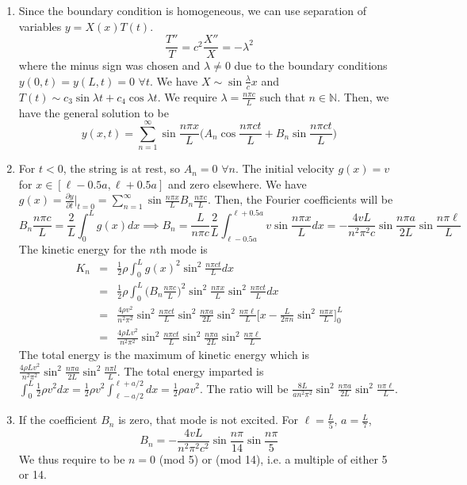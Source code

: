 \documentclass[a4paper]{article}
\begin{document}
\begin{ans}\leavevmode
\begin{enumerate}[label=(\alph*)]
\item Since the boundary condition is homogeneous, we can use separation of variables $y=X(x)T(t)$.
$$\frac{T''}{T}=c^2\frac{X''}{X}=-\lambda^2$$
where the minus sign was chosen and $\lambda\neq 0$ due to the boundary conditions $y(0,t)=y(L,t)=0$ $\forall t$. We have $X\sim\sin\frac{\lambda}{c}x$ and $T(t)\sim c_3\sin\lambda t+c_4\cos\lambda t$. We require $\lambda=\frac{n\pi c}{L}$ such that $n\in\mathbb{N}$. Then, we have the general solution to be
$$y(x,t)=\sum_{n=1}^\infty\sin\frac{n\pi x}{L}\bigg(A_n\cos\frac{n\pi ct}{L}+B_n\sin\frac{n\pi ct}{L}\bigg)$$
\item For $t<0$, the string is at rest, so $A_n=0$ $\forall n$. The initial velocity $g(x)=v$ for $x\in[\ell-0.5a,\ell+0.5a]$ and zero elsewhere. We have $g(x)=\frac{\partial y}{\partial t}|_{t=0}=\sum_{n=1}^\infty\sin\frac{n\pi x}{L}B_n\frac{n\pi c}{L}$. Then, the Fourier coefficients will be
$$B_n\frac{n\pi c}{L}=\frac{2}{L}\int_0^Lg(x)dx\implies B_n=\frac{L}{n\pi c}\frac{2}{L}\int_{\ell-0.5a}^{\ell+0.5a}v\sin\frac{n\pi x}{L}dx=-\frac{4vL}{n^2\pi^2c}\sin\frac{n\pi a}{2L}\sin\frac{n\pi\ell}{L}$$
The kinetic energy for the $n$th mode is
\begin{eqnarray}
K_n&=&\frac{1}{2}\rho\int_0^Lg(x)^2\sin^2\frac{n\pi ct}{L}dx\nonumber\\&=&\frac{1}{2}\rho\int_0^L\bigg(B_n\frac{n\pi c}{L}\bigg)^2\sin^2\frac{n\pi x}{L}\sin^2\frac{n\pi ct}{L}dx\nonumber\\&=&\frac{4\rho v^2}{n^2\pi^2}\sin^2\frac{n\pi ct}{L}\sin^2\frac{n\pi a}{2L}\sin^2\frac{n\pi \ell}{L}\bigg[x-\frac{L}{2\pi n}\sin^2\frac{n\pi x}{L}\bigg]_0^L\nonumber\\&=&\frac{4\rho Lv^2}{n^2\pi^2}\sin^2\frac{n\pi ct}{L}\sin^2\frac{n\pi a}{2L}\sin^2\frac{n\pi \ell}{L}\nonumber
\end{eqnarray}
The total energy is the maximum of kinetic energy which is $\frac{4\rho Lv^2}{n^2\pi^2}\sin^2\frac{n\pi a}{2L}\sin^2\frac{n\pi l}{L}$. The total energy imparted is $\int_0^L\frac{1}{2}\rho v^2dx=\frac{1}{2}\rho v^2\int_{\ell-a/2}^{\ell+a/2}dx=\frac{1}{2}\rho av^2$. The ratio will be $\frac{8L}{an^2\pi^2}\sin^2\frac{n\pi a}{2L}\sin^2\frac{n\pi\ell}{L}$.
\item If the coefficient $B_n$ is zero, that mode is not excited. For $\ell=\frac{L}{5}$, $a=\frac{L}{7}$, 
$$B_n=-\frac{4vL}{n^2\pi^2c^2}\sin\frac{n\pi}{14}\sin\frac{n\pi}{5}$$
We thus require to be $n=0$ (mod 5) or (mod 14), i.e. a multiple of either 5 or 14.
\end{enumerate}
\end{ans}
\end{document}
